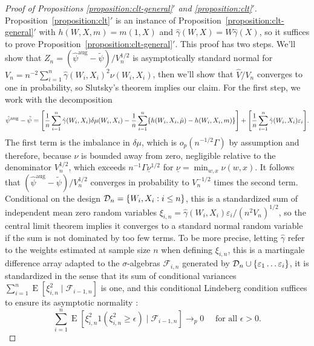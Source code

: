 \documentclass{article}
\DeclarePairedDelimiter\abs{\lvert}{\rvert}
\DeclarePairedDelimiter\set{\{}{\}}
\DeclarePairedDelimiter\sqb{[}{]}
\theoremstyle{definition}
\DeclareMathOperator{\E}{E}
\newcommand{\dm}{\delta \mu}
\newcommand{\hgamma}{\ensuremath{\hat\gamma}}
\newcommand{\aug}{\text{aug}}
\newcommand{\<}{\langle}
\renewcommand{\>}{\rangle}
\begin{document}
\begin{refsection}

\begin{proof}[Proof of Propositions \ref{proposition:clt-general}$'$ and \ref{proposition:clt}$'$]
Proposition~\ref{proposition:clt}$'$ is an instance of Proposition~\ref{proposition:clt-general}$'$ with $h(W,X,m) = m(1,X)$ and $\hgamma(W,X) = W\hgamma(X)$, so it suffices to prove Proposition~\ref{proposition:clt-general}$'$. This proof has two steps. We'll show that $Z_n=(\hat\psi^{\aug} - \tilde\psi)/V_n^{1/2}$ is asymptotically standard normal for $V_n = n^{-2}\sum_{i=1}^n \hgamma(W_i, X_i)^2 \nu(W_i, X_i)$, then we'll show that $\hat V / V_n$ converges to one in probability, so Slutsky's theorem implies our claim. For the first step, we work with the decomposition
\[
\hat\psi^{\aug} - \tilde\psi =
\sqb*{ \frac{1}{n}\sum_{i=1}^n \hgamma(W_i, X_i) \dm(W_i, X_i) - \frac{1}{n}\sum_{i=1}^n \{h(W_i, X_i,\hat \mu) - h(W_i, X_i, m)\} } +
\sqb*{\frac{1}{n}\sum_{i=1}^n  \hgamma(W_i, X_i)\varepsilon_i  }.
\]
The first term is the imbalance in $\dm$, which is $o_p(n^{-1/2}\Gamma)$ by assumption and therefore, because $\nu$ is bounded away from zero, negligible relative to the denominator $V_n^{1/2}$, which exceeds $n^{-1}\Gamma \underline{\nu}^{1/2}$ for $\underline{\nu}=\min_{w,x}\nu(w,x)$.
It follows that $(\hat\psi^{\aug} - \tilde\psi)/V_n^{1/2}$ converges in probability to $V_n^{-1/2}$ times the second term.
Conditional on the design $\mathcal{D}_n=\set{W_i, X_i : i \le n}$, this is a standardized sum of independent mean zero random variables
$\xi_{i,n}= \hgamma(W_i, X_i)\varepsilon_i / (n^2 V_n)^{1/2}$, so
the central limit theorem implies it converges to a standard normal random variable if the sum is not dominated by too few terms.
To be more precise, letting $\hat\gamma$
refer to the weights estimated at sample size $n$ when defining $\xi_{i,n}$, this is a martingale difference array adapted to the $\sigma$-algebras $\mathcal{F}_{i,n}$ generated by $\mathcal{D}_n \cup \set{\varepsilon_1 \ldots \varepsilon_{i}}$, it is standardized in the sense that its sum of conditional variances $\sum_{i=1}^n \E[\xi_{i,n}^2 \mid \mathcal{F}_{i-1,n}]$ is one, and this conditional Lindeberg condition suffices to ensure its asymptotic normality \citep[Corollary 3.1]{hall2014martingale}:
\[ \sum_{i=1}^n \E[\xi_{i,n}^2 1(\xi_{i,n}^2 \ge \epsilon) \mid \mathcal{F}_{i-1,n}] \to_p 0 \quad \text{ for all } \epsilon > 0. \]

\end{proof}
\end{refsection}
\end{document}
